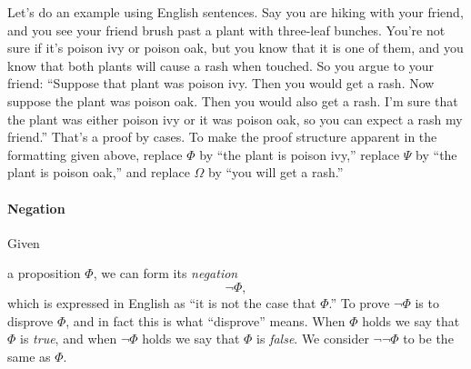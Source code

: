 \documentclass[12pt]{article}
\newcounter{theorem}
\def\putThmNumber{\refstepcounter{theorem}\thetheorem}
\newcommand{\indented}[1]{\begin{adjustwidth}{1em}{}#1\end{adjustwidth}}
\def\thmcolonspace{\hspace{0.2em}}
\newcommand{\thmbox}[1]{\fbox{\parbox{\textwidth}{{#1}}}}
\newcommand{\THM}[1]{\thmbox{\textbf{Theorem \putThmNumber:} \thmcolonspace #1}}
\def\pA{\Phi}
\def\pB{\Psi}
\def\pC{\Omega}
\begin{document}
Let's do an example using English sentences.
Say you are hiking with your friend, and you see your friend brush past a plant with three-leaf bunches. You're not sure if it's poison ivy or poison oak, but you
know that it is one of them, and you know that both plants will cause a rash when touched.
So you argue to your friend: ``Suppose that plant was poison ivy. Then you would get a rash.
Now suppose the plant was poison oak. Then you would also get a rash. I'm sure that the plant was either poison ivy or it was poison oak, so you can expect a rash my friend.''
That's a proof by cases.
To make the proof structure apparent in
the formatting given above, replace $\pA$ by ``the plant is poison ivy,'' replace $\pB$ by ``the plant is poison oak,'' and replace $\pC$ by ``you will get a rash.''


\paragraph{Negation}
\hypertarget{hl:NOT}{Given} a proposition $\pA$, we can form its \emph{negation}
$$
\neg \pA,
$$
which is expressed in English as ``it is not the case that $\pA$.''
To prove $\neg\pA$ is to disprove $\pA$, and in fact this is what ``disprove'' means.
When $\pA$ holds we say that $\pA$ is \emph{true}, and when $\neg\pA$ holds we say that $\pA$ is \emph{false}.
We consider $\neg\neg\pA$ to be the same as $\pA$.
\end{document}
